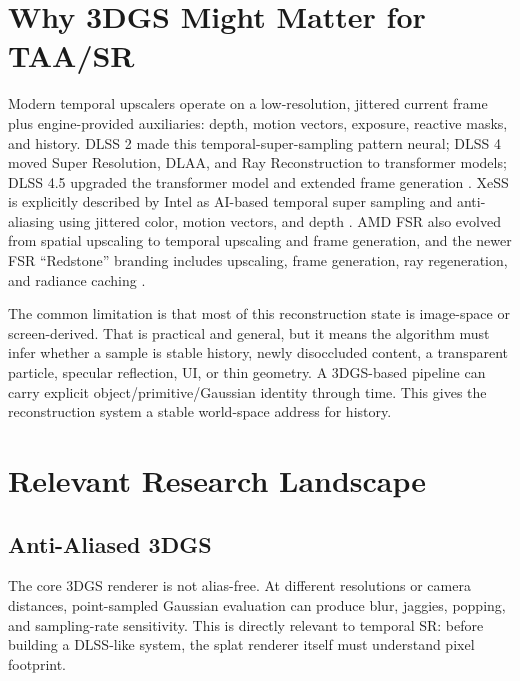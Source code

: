 \documentclass[11pt]{article}
\begin{document}
\section{Why 3DGS Might Matter for TAA/SR}

Modern temporal upscalers operate on a low-resolution, jittered current frame
plus engine-provided auxiliaries: depth, motion vectors, exposure, reactive
masks, and history. DLSS 2 made this temporal-super-sampling pattern neural;
DLSS 4 moved Super Resolution, DLAA, and Ray Reconstruction to transformer
models; DLSS 4.5 upgraded the transformer model and extended frame generation
\cite{nvidia2025dlss4,nvidia2026dlss45}. XeSS is explicitly described by Intel
as AI-based temporal super sampling and anti-aliasing using jittered color,
motion vectors, and depth \cite{intel2026xess}. AMD FSR also evolved from
spatial upscaling to temporal upscaling and frame generation, and the newer FSR
``Redstone'' branding includes upscaling, frame generation, ray regeneration,
and radiance caching \cite{amd2026fsr}.

The common limitation is that most of this reconstruction state is image-space
or screen-derived. That is practical and general, but it means the algorithm
must infer whether a sample is stable history, newly disoccluded content, a
transparent particle, specular reflection, UI, or thin geometry. A 3DGS-based
pipeline can carry explicit object/primitive/Gaussian identity through time.
This gives the reconstruction system a stable world-space address for history.

\section{Relevant Research Landscape}

\subsection{Anti-Aliased 3DGS}

The core 3DGS renderer is not alias-free. At different resolutions or camera
distances, point-sampled Gaussian evaluation can produce blur, jaggies, popping,
and sampling-rate sensitivity. This is directly relevant to temporal SR:
before building a DLSS-like system, the splat renderer itself must understand
pixel footprint.
\end{document}
